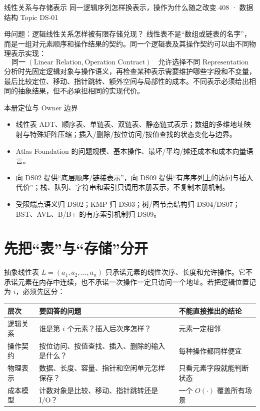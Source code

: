 \documentclass[UTF8,fontset=none,11pt,a4paper]{ctexart}
\begin{document}
\handbooktitle
  {线性关系与存储表示}
  {同一逻辑序列怎样换表示，操作为什么随之改变}
  {408 · 数据结构 Topic DS-01}

\begin{corebox}{母问题：逻辑线性关系怎样被有限存储兑现？}
线性表不是“数组或链表的名字”，而是一组对元素顺序和操作结果的契约。同一个逻辑表及其操作契约可以由不同物理表示实现：
\[
\boxed{
\text{同一 }(\text{Linear Relation},\text{Operation Contract})
\quad\text{允许选择不同 Representation}
}
\]
分析时先固定逻辑对象与操作语义，再检查某种表示需要维护哪些字段和不变量，最后比较定位、移动、指针跳转、额外空间与局部性的成本。不同表示必须给出相同的抽象结果，但不必承担相同的实现代价。
\end{corebox}

\begin{methodbox}{本册定位与 Owner 边界}
\begin{itemize}
\item {}线性表 ADT、顺序表、单链表、双链表、静态链式表示；数组的多维地址映射与特殊矩阵压缩；插入/删除/按位访问/按值查找的状态变化与边界。
\item {}Atlas Foundation 的问题规模、基本操作、最坏/平均/摊还成本和成本向量语言。
\item {}向 DS02 提供“底层顺序/链接表示”，向 DS09 提供“有序序列上的访问与插入代价”；栈、队列、字符串和索引只调用本册表示，不复制本册机制。
\item {}受限端点语义归 DS02；KMP 归 DS03；树/图节点结构归 DS04/DS07；BST、AVL、B/B+ 的有序索引机制归 DS09。
\end{itemize}
\end{methodbox}

\tableofcontents\newpage

\section{先把“表”与“存储”分开}
抽象线性表 $L=(a_1,a_2,\ldots,a_n)$ 只承诺元素的线性次序、长度和允许操作。它不承诺元素在内存中连续，也不承诺一次操作一定只访问一个地址。若把逻辑位置记为 $i$，必须先区分：
\begin{center}\small
\begin{tabularx}{\linewidth}{L{2.1cm}YY}
\toprule
层次 & 要回答的问题 & 不能直接推出的结论\\
\midrule
逻辑关系 & 谁是第 $i$ 个元素？插入后次序怎样？ & 元素一定相邻\\
操作契约 & 按位访问、按值查找、插入、删除的输入是什么？ & 每种操作都同样便宜\\
物理表示 & 数据、长度、容量、指针和空闲单元怎样保存？ & 只看元素字段就能判断状态\\
成本模型 & 计数对象是比较、移动、指针跳转还是 I/O？ & 一个 $O(\cdot)$ 覆盖所有场景\\
\bottomrule
\end{tabularx}\end{center}
\end{document}

